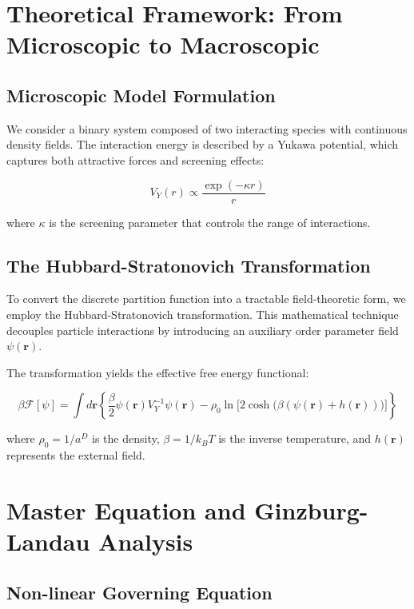 \documentclass[12pt,a4paper]{article}
\begin{document}
\section{Theoretical Framework: From Microscopic to Macroscopic}

\subsection{Microscopic Model Formulation}

We consider a binary system composed of two interacting species with continuous density fields. The interaction energy is described by a Yukawa potential, which captures both attractive forces and screening effects:

\begin{equation}
    V_Y(r) \propto \frac{\exp(-\kappa r)}{r}
\end{equation}

where $\kappa$ is the screening parameter that controls the range of interactions.

\subsection{The Hubbard-Stratonovich Transformation}

To convert the discrete partition function into a tractable field-theoretic form, we employ the Hubbard-Stratonovich transformation. This mathematical technique decouples particle interactions by introducing an auxiliary order parameter field $\psi(\mathbf{r})$.

The transformation yields the effective free energy functional:

\begin{equation}
    \beta \mathcal{F}[\psi] = \int d\mathbf{r} \left\{ \frac{\beta}{2} \psi(\mathbf{r}) V_Y^{-1} \psi(\mathbf{r}) - \rho_0 \ln \Big[ 2\cosh\big(\beta(\psi(\mathbf{r}) + h(\mathbf{r}))\big) \Big] \right\}
\end{equation}

where $\rho_0 = 1/a^D$ is the density, $\beta = 1/k_B T$ is the inverse temperature, and $h(\mathbf{r})$ represents the external field.

\section{Master Equation and Ginzburg-Landau Analysis}

\subsection{Non-linear Governing Equation}
\end{document}
